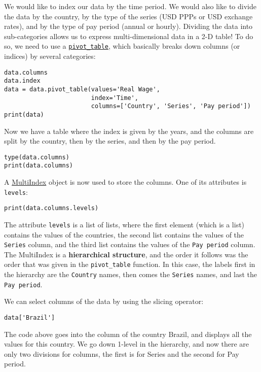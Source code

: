 \documentclass[12pt, a4paper]{article}
\begin{document}
We would like to index our data by the time period.
We would also like to divide the data by the country, by the type of the series (USD PPPs or USD exchange rates), and by the type of pay period (annual or hourly).
Dividing the data into sub-categories allows us to express multi-dimensional data in a 2-D table!
To do so, we need to use a \href{https://pandas.pydata.org/pandas-docs/stable/reference/api/pandas.pivot\_table.html}{\texttt{pivot\_table}}, which basically breaks down columns (or indices) by several categories:
\lstset{language=jupyter-python,label= ,caption= ,captionpos=b,numbers=none}
\begin{lstlisting}
data.columns
data.index
data = data.pivot_table(values='Real Wage',
                        index='Time',
                        columns=['Country', 'Series', 'Pay period'])
print(data)
\end{lstlisting}

Now we have a table where the index is given by the years, and the columns are split by the country, then by the series, and then by the pay period.
\lstset{language=jupyter-python,label= ,caption= ,captionpos=b,numbers=none}
\begin{lstlisting}
type(data.columns)
print(data.columns)
\end{lstlisting}

A \href{https://pandas.pydata.org/pandas-docs/stable/user\_guide/advanced.html}{MultiIndex} object is now used to store the columns.
One of its attributes is \texttt{levels}:
\lstset{language=jupyter-python,label= ,caption= ,captionpos=b,numbers=none}
\begin{lstlisting}
print(data.columns.levels)
\end{lstlisting}

The attribute \texttt{levels} is a list of lists, where the first element (which is a list) contains the values of the countries, the second list contains the values of the \texttt{Series} column, and the third list contains the values of the \texttt{Pay period} column.
The MultiIndex is a \textbf{\textbf{hierarchical structure}}, and the order it follows was the order that was given in the \texttt{pivot\_table} function.
In this case, the labels first in the hierarchy are the \texttt{Country} names, then comes the \texttt{Series} names, and last the \texttt{Pay period}.

We can select columns of the data by using the slicing operator:
\lstset{language=jupyter-python,label= ,caption= ,captionpos=b,numbers=none}
\begin{lstlisting}
data['Brazil']
\end{lstlisting}
The code above goes into the column of the country Brazil, and displays all the values for this country.
We go down 1-level in the hierarchy, and now there are only two divisions for columns, the first is for Series and the second for Pay period.
\end{document}
